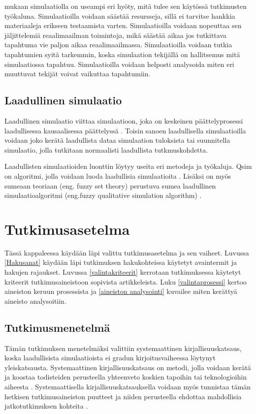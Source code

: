 \documentclass[utf8]{gradu3}
\begin{document}
\cite{banks1999introduction} mukaan simulaatiolla on useampi eri hyöty, mitä tulee sen käytössä tutkimusten työkaluna. Simulaatioilla voidaan säästää resursseja, sillä ei tarvitse hankkia materiaaleja erikseen testaamista varten. Simulaatioilla voidaan nopeuttaa sen jäljittelemiä reaalimaailman toimintoja, mikä säästää aikaa jos tutkittava tapahtuma vie paljon aikaa reaalimaailmassa. Simulaatioilla voidaan tutkia tapahtumien syitä tarkemmin, koska simulaation tekijällä on hallitsemus mitä simulaatiossa tapahtuu. Simulaatioilla voidaan helposti analysoida miten eri muuttuvat tekijät voivat vaikuttaa tapahtumiin.

\section{Laadullinen simulaatio} \label{laadullinen simulaatio}
Laadullinen simulaatio viittaa simulaatioon, joka on keskeinen päättelyprosessi laadullisessa kausaalisessa päättelyssä \parencite{kuipers1986qualitative}.
Toisin sanoen laadullisella simulaatioilla voidaan joko kerätä laadullista dataa simulaation tuloksista tai suunnitella simulaatio, jolla tutkitaan normaalisti laadullista tutkmuskohdetta.

Laadullisten simulaatioiden luonttin löytyy useita eri metodeja ja työkaluja.
Qsim on algoritmi, jolla voidaan luoda laadullisia simulaatioita \parencite{kuipers1986qualitative}. Lisäksi on myös sumeaan teoriaan (eng. fuzzy set theory) perustuva sumea laadullinen simulaatioalgoritmi (eng.fuzzy qualitative simulation algorithm) \parencite{shen1993fuzzy}.

\chapter{Tutkimusasetelma}
Tässä kappaleessa käydään läpi valittu tutkimusasetelma ja sen vaiheet. Luvussa \ref{Hakusanat} käydään läpi tutkimuksen hakukohteissa käytetyt avaintermit ja hakujen rajaukset. Luvussa \ref{valintakriteerit} kerrotaan tutkimuksessa käytetyt kriteerit tutkimusaineistoon sopivista artikkeleista. Luku \ref{valintaprosessi} kertoo aineiston keruun prosessista ja \ref{aineiston analysointi} kuvailee miten kerättyä aineisto analysoitiin.

\section{Tutkimusmenetelmä}
Tämän tutkimuksen menetelmäksi valittiin systemaattinen kirjallisuuskatsaus, koska laadullisista simulaatioista ei gradun kirjoitusvaiheessa löytynyt yleiskatsausta. Systemaattinen kirjallisuuskatsaus on metodi, jolla voidaan kerätä ja koostaa todisteiden perusteella yhteenveto koskien tapoihin tai teknologioihin aiheesta \parencite{keele2007guidelines}. Systemaattisella kirjallisuuskatsauksella voidaan myös tunnistaa tämän hetkisen tutkimusaineiston puutteet ja niiden perusteella ehdottaa mahdollisia jatkotutkimuksen kohteita \parencite{keele2007guidelines}.
\end{document}
